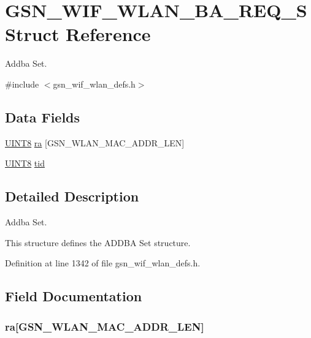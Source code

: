 \hypertarget{a00370}{
\section{GSN\_\-WIF\_\-WLAN\_\-BA\_\-REQ\_\-S Struct Reference}
\label{a00370}
}


Addba Set.  




{\ttfamily \#include $<$gsn\_\-wif\_\-wlan\_\-defs.h$>$}

\subsection*{Data Fields}
\begin{DoxyCompactItemize}
\item 
\hyperlink{a00660_gab27e9918b538ce9d8ca692479b375b6a}{UINT8} \hyperlink{a00370_a1d97eb2e070b4a95218b41f6abbff9d7}{ra} \mbox{[}GSN\_\-WLAN\_\-MAC\_\-ADDR\_\-LEN\mbox{]}
\item 
\hyperlink{a00660_gab27e9918b538ce9d8ca692479b375b6a}{UINT8} \hyperlink{a00370_abf69ed815c8482f9995e41bc0aff9043}{tid}
\end{DoxyCompactItemize}


\subsection{Detailed Description}
Addba Set. 

This structure defines the ADDBA Set structure. 

Definition at line 1342 of file gsn\_\-wif\_\-wlan\_\-defs.h.



\subsection{Field Documentation}
\hypertarget{a00370_a1d97eb2e070b4a95218b41f6abbff9d7}{
\subsubsection[{ra}]{ {\bf ra}\mbox{[}GSN\_\-WLAN\_\-MAC\_\-ADDR\_\-LEN\mbox{]}}}
\label{a00370_a1d97eb2e070b4a95218b41f6abbff9d7}


